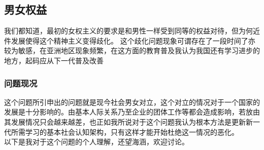 \documentclass[supercite]{Experimental_Report}
\theoremstyle{definition}
\begin{document}
	\subsection{男女权益}
	我们都知道，最初的女权主义的要求是和男性一样受到同等的权益对待，但为何近件发展使得这个精神主义变得歧化。
	这个歧化问题现象可谓存在了一段时间了亦较为敏感，在亚洲地区现象频繁，在这方面的教育普及我认为我国还有学习进步的地方，起码应从下一代普及改善
	\subsubsection{问题现况}
	这个问题所引申出的问题就是现今社会男女对立，这个对立的情况对于一个国家的发展是十分影响的。由基本人际关系乃至企业的团体工作等都会造成影响，若放由其发展情况只会越来越差，也正如我所说对于这个问题我认为根本方法是更新新一代所需学习的基本社会认知架构，只有这样才能开始杜绝这一情况的恶化。\\
	以下是我对于这个问题的个人理解，还望海涵，欢迎讨论。
	
\end{document}
